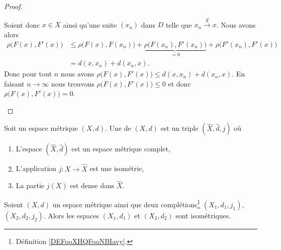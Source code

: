 \begin{proof}
\begin{subproof}
		Soient donc \( x\in X\) ainsi qu'une suite \( (x_n)\) dans \( D\) telle que \( x_n\stackrel{X}{\longrightarrow}x\). Nous avons alors
		\begin{subequations}
			\begin{align}
				\rho\big( F(x),F'(x) \big) & \leq \rho\big( F(x),F(x_n) \big)+\underbrace{\rho\big( F(x_n),F'(x_n) \big)}_{=0}+\rho\big( F'(x_n),F'(x) \big) \\
				                           & =d(x,x_n)+d(x_n,x).
			\end{align}
		\end{subequations}
		Donc pour tout \( n\) nous avons \( \rho\big( F(x),F'(x) \big)\leq d(x,x_n)+d(x_n,x)\). En faisant \( n\to\infty\) nous trouvons \( \rho\big( F(x),F'(x) \big)\leq 0\) et donc \( \rho\big( F(x),F'(x) \big)=0\).
	\end{subproof}
\end{proof}

\begin{definition}        \label{DEFooXHQFooNBIavy}
	Soit un espace métrique \( (X,d)\). Une  de \( (X,d)\) est un triple \( (\hat X,\hat d,j)\) où
	\begin{enumerate}
		\item
		      L'espace \( (\hat X,\hat d)\) est un espace métrique complet,
		\item
		      L'application \( j\colon X\to \hat X\) est une isométrie,
		\item
		      La partie \( j(X)\) est dense dans \( \hat X\).
	\end{enumerate}
\end{definition}

\begin{theorem}       \label{THOooRLYBooCVBjoP}
	Soient \( (X,d)\) un espace métrique ainsi que deux complétions\footnote{Définition \ref{DEFooXHQFooNBIavy}.} \( (X_1, d_1, j_1)\), \( (X_2,d_2,j_2)\). Alors les espaces \( (X_1,d_1) \) et \( (X_2,d_2)\) sont isométriques.
\end{theorem}

